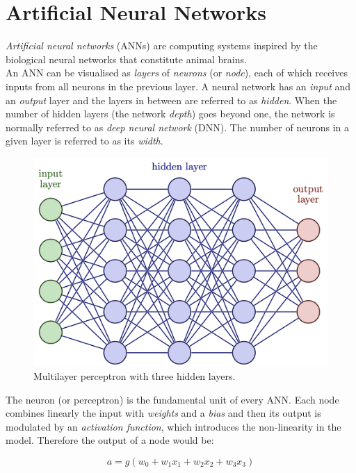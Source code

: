 \section{Artificial Neural Networks}

\textit{Artificial neural networks} (ANNs) are computing systems inspired by the biological neural networks that constitute animal brains.\\
An ANN can be visualised as \textit{layers} of \textit{neurons} (or \textit{node}), each of which receives inputs from all neurons in the previous layer.
A neural network has an \textit{input} and an \textit{output} layer and the layers in between are referred to as \textit{hidden}.
When the number of hidden layers (the network \textit{depth}) goes beyond one, the network is normally referred to as \textit{deep neural network} (DNN). 
The number of neurons in a given layer is referred to as its \textit{width}.

\begin{figure}[h]
\centering
\includegraphics[scale=0.5]{sections/Chapters/Chapter2/foto.png}
\caption{Multilayer perceptron with three hidden layers.}
\end{figure}

The neuron (or perceptron) is the fundamental unit of every ANN.
Each node combines linearly the input with \textit{weights} and a \textit{bias} and then its output is modulated by an \textit{activation function}, which introduces the non-linearity in the model.
Therefore the output of a node would be:

\begin{equation}
a = g(w_{0} + w_{1} x_1 + w_{2} x_2 + w_{3} x_3)
\end{equation}


